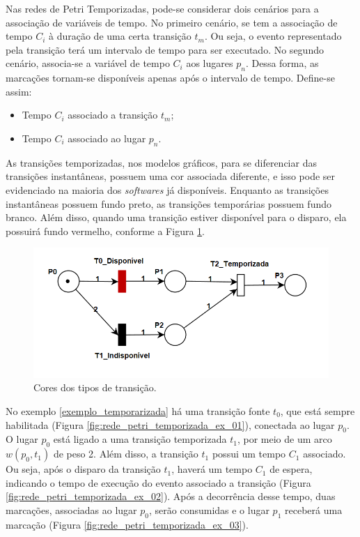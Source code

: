 \documentclass[
	12pt,				%
	openright,			%
	oneside,			%
	a4paper,			%
	english,			%
	brazil				%
	]{abntex2}
\theoremstyle{doispontos}
\begin{document}
Nas redes de Petri Temporizadas, pode-se considerar dois cenários para a associação de variáveis de tempo. No primeiro cenário, se tem a associação de tempo $C_{i}$ à duração de uma certa transição $t_{m}$. Ou seja, o evento representado pela transição terá um intervalo de tempo para ser executado. No segundo cenário, associa-se a variável de tempo $C_{i}$ aos lugares $p_{n}$. Dessa forma, as marcações tornam-se disponíveis apenas após o intervalo de tempo. Define-se assim: 

\begin{itemize}
        \item Tempo $C_{i}$ associado a transição $t_{m}$;
        \item Tempo $C_{i}$ associado ao lugar $p_{n}$.
\end{itemize}

As transições temporizadas, nos modelos gráficos, para se diferenciar das transições instantâneas, possuem uma cor associada diferente, e isso pode ser evidenciado na maioria dos \textit{softwares} já disponíveis. Enquanto as transições instantâneas possuem fundo preto, as transições temporárias possuem fundo branco. Além disso, quando uma transição estiver disponível para o disparo, ela possuirá fundo vermelho, conforme a Figura \ref{fig:cores_transição}. 

\begin{figure}[ht] 
	\centering
	\includegraphics[scale=0.75]{figuras/exemplo_cores_transicao.png}
	\caption[Cores dos tipos de transição]{Cores dos tipos de transição.}
	\label{fig:cores_transição}
\end{figure}
\FloatBarrier

No exemplo \ref{exemplo_temporarizada} há uma transição fonte $t_{0}$, que está sempre habilitada (Figura \ref{fig:rede_petri_temporizada_ex_01}), conectada ao lugar $p_{0}$. O lugar $p_{0}$ está ligado a uma transição temporizada $t_{1}$, por meio de um arco $w(p_{0},t_{1})$ de peso 2. Além disso, a transição $t_{1}$ possui um tempo $C_{1}$ associado. Ou seja, após o disparo da transição $t_{1}$, haverá um tempo $C_{1}$ de espera, indicando o tempo de execução do evento associado a transição (Figura \ref{fig:rede_petri_temporizada_ex_02}). Após a decorrência desse tempo, duas marcações, associadas ao lugar $p_{0}$, serão consumidas e o lugar $p_{1}$ receberá uma marcação (Figura \ref{fig:rede_petri_temporizada_ex_03}).  
\end{document}
